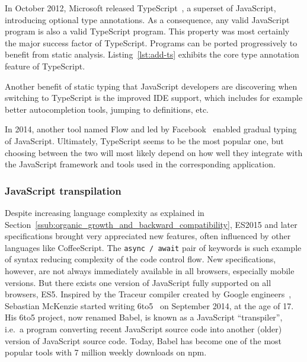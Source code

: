 In October 2012, Microsoft released TypeScript~\cite{bierman2014understanding},
a superset of JavaScript, introducing optional type annotations.
As a consequence, any valid JavaScript program is also a valid TypeScript program.
This property was most certainly the major success factor of TypeScript.
Programs can be ported progressively to benefit from static analysis.
Listing~\ref{lst:add-ts} exhibits the core type annotation feature of TypeScript.



Another benefit of static typing that JavaScript developers are discovering when
switching to TypeScript is the improved IDE support,
which includes for example better autocompletion tools, jumping to definitions, etc.

In 2014, another tool named Flow and led by Facebook~\cite{chaudhuri2017fast}
enabled gradual typing of JavaScript.
Ultimately, TypeScript seems to be the most popular one,
but choosing between the two will most likely depend on how well they integrate
with the JavaScript framework and tools used in the corresponding application.

\subsubsection{JavaScript transpilation}%
\label{ssub:javascript_transpilation}

Despite increasing language complexity
as explained in Section~\ref{ssub:organic_growth_and_backward_compatibility},
ES2015 and later specifications brought very appreciated new features,
often influenced by other languages like CoffeeScript.
The \verb|async / await| pair of keywords is such example of syntax
reducing complexity of the code control flow.
New specifications, however, are not always immediately available in all browsers,
especially mobile versions.
But there exists one version of JavaScript fully supported on all browsers, ES5.
Inspired by the Traceur compiler created by Google engineers~\cite{traceur},
Sebastian McKenzie started writing \textsf{6to5}~\cite{babel}
on September 2014, at the age of 17.
His \textsf{6to5} project, now renamed Babel, is known as a JavaScript ``transpiler'',
i.e.\ a program converting recent JavaScript source code into another (older) version
of JavaScript source code.
Today, Babel has become one of the most popular tools
with 7 million weekly downloads on \textsf{npm}.


